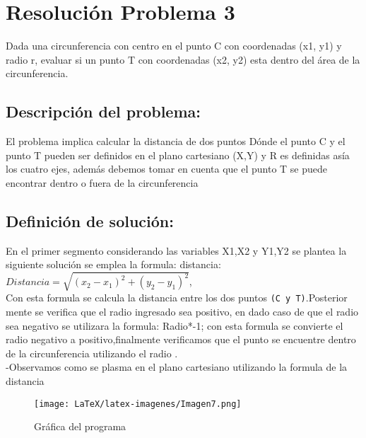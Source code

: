 \section{Resolución Problema 3}
Dada una circunferencia con centro en el punto
C con coordenadas (x1, y1) y radio r, evaluar si
un punto T con coordenadas (x2, y2) esta dentro
del área de la circunferencia.


\subsection{\textbf{Descripción del problema:}}
El problema implica calcular la distancia de dos puntos 
Dónde el punto C y el punto T pueden ser definidos en el plano cartesiano (X,Y) y R es definidas asía los cuatro ejes, además debemos tomar en cuenta que el punto T se puede encontrar dentro o fuera de la circunferencia 


\subsection{\textbf{Definición de solución:}}
En el primer segmento considerando las variables X1,X2 y Y1,Y2 se plantea la siguiente solución se emplea la formula: distancia:
\\
${Distancia} = \sqrt{{(x_2 - x_1)^2 + (y_2 - y_1)^2}}$,
\\
Con esta formula se calcula la distancia entre los dos puntos  \texttt{(C y T)}.Posterior mente se verifica que el radio ingresado sea positivo, en dado caso de que el radio sea negativo se utilizara la formula: Radio*-1; con esta formula se convierte el radio negativo a positivo,finalmente verificamos que el punto se encuentre dentro de la circunferencia utilizando el radio . 
\\
-Observamos como se plasma en el plano cartesiano utilizando la formula de la distancia
\begin{figure}[H]
    \centering
    \texttt{[image: LaTeX/latex-imagenes/Imagen7.png]}
    \caption{Gráfica del programa}
    \label{fig:imagen7}
\end{figure}


